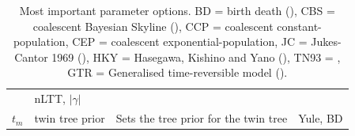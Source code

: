 \documentclass{article}
\begin{document}
\begin{table}
\begin{tabular}{|@{}c|p{2.5cm}|p{9cm}|p{4.5cm}@{}|}
      & nLTT, $|\gamma|$ \\
    $\mathit{t_{m}}$ & twin tree prior & Sets the tree prior for the twin tree 
      & Yule, BD \\
    \hline
  \end{tabular}
  \caption{
    Most important parameter options. 
    BD = birth death (\cite{nee1994reconstructed}), 
    CBS = coalescent Bayesian Skyline (\cite{drummond2005bayesian}), 
    CCP = coalescent constant-population, 
    CEP = coalescent exponential-population,
    JC = Jukes-Cantor 1969 (\cite{jukes1969evolution}), 
    HKY = Hasegawa, Kishino and  Yano (\cite{hasegawa1985dating}), 
    TN93 = \cite{tamura1993estimation}, 
    GTR = Generalised time-reversible model (\cite{tavare1986some}).
  }
  \label{tab:options}
\bigskip


\end{table}
\end{document}
